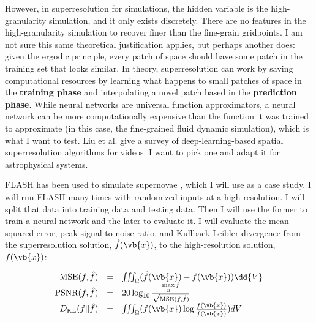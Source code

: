 However, in superresolution for simulations, the hidden variable is the high-granularity simulation, and it only exists discretely. There are no features in the high-granularity simulation to recover finer than the fine-grain gridpoints. I am not sure this same theoretical justification applies, but perhaps another does: given the ergodic principle, every patch of space should have some patch in the training set that looks similar. In theory, superresolution can work by saving computational resources by learning what happens to small patches of space in the \textbf{training phase} and interpolating a novel patch based in the \textbf{prediction phase}. While neural networks are universal function approximators, a neural network can be more computationally expensive than the function it was trained to approximate (in this case, the fine-grained fluid dynamic simulation), which is what I want to test. Liu et al. \cite{survey} give a survey of deep-learning-based spatial superresolution algorithms for videos. I want to pick one and adapt it for astrophysical systems.
%

FLASH \cite{FLASH} has been used to simulate supernovae \cite{supernova-simulation}, which I will use as a case study. I will run FLASH many times with randomized inputs at a high-resolution. I will split that data into training data and testing data. Then I will use the former to train a neural network and the later to evaluate it. I will evaluate the mean-squared error, peak signal-to-noise ratio, and Kullback-Leibler divergence from the superresolution solution, \(\hat{f}(\vb{x})\), to the high-resolution solution, \(f(\vb{x})\):

\[
\begin{array}{rcl}
  \text{MSE}(f, \hat{f}) & = & \iiint_{\Omega} (\hat{f}(\vb{x}) - f(\vb{x})) \dd{V} \\
  \text{PSNR}(f, \hat{f}) & = & 20 \log_{10} \frac{\max\limits_\Omega f}{\sqrt{\text{MSE}(f, \hat{f})}} \\
  D_\text{KL}(f || \hat{f}) & = & \iiint_{\Omega} (f(\vb{x}) \log \frac{f(\vb{x})}{\hat{f}(\vb{x})}) dV \\
\end{array}
\]

